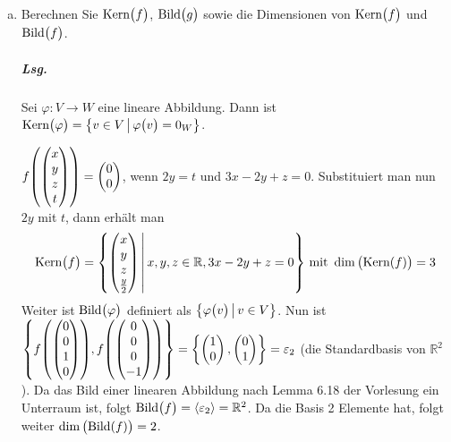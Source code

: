 \documentclass{scrreprt}
\newcommand\Bild{\text{Bild}}
\newcommand\Kern{\text{Kern}}
\newcommand\hull[1]{\left\langle #1 \right\rangle}
\begin{document}
\begin{enumerate}[(a)]
\item Berechnen Sie $\Kern\qty\big(f)$, $\Bild\qty\big(g)$ sowie die Dimensionen
  von $\Kern\qty\big(f)$ und $\Bild\qty\big(f)$.
  \subparagraph{Lsg.} Sei $\varphi \colon V \to W$ eine lineare Abbildung.
  Dann ist $\Kern\qty\big(\varphi) =
  \qty\big{v \in V \,{\big |}\, \varphi\qty\big(v) = 0_W}$.

  $f\qty(\begin{pmatrix} x \\ y \\ z \\ t\end{pmatrix}) =
  \begin{pmatrix} 0 \\ 0 \end{pmatrix}$, wenn $2y = t$ und
  $3x - 2y + z = 0$.
  Substituiert man nun $2y$ mit $t$, dann erhält man
  \[
    \Kern\qty\big(f) = \qty{
      \begin{pmatrix}
        x \\
        y \\
        z \\
        \frac{y}{2}
      \end{pmatrix} \,\middle|\,
      x, y, z \in \mathbb{R}, 3x - 2y + z = 0
    } \text{ mit } \dim\qty\big(\Kern(f)) = 3
  \]
  Weiter ist $\Bild\qty\big(\varphi)$ definiert als
  $\qty\big{\varphi\qty\big(v) \,{\big|}\, v \in V}$.
  Nun ist $\qty{
    f\qty(\begin{pmatrix} 0 \\ 0 \\ 1 \\ 0\end{pmatrix}),
    f\qty(\begin{pmatrix} 0 \\ 0 \\ 0 \\ -1\end{pmatrix})
  } = \qty{
    \begin{pmatrix} 1 \\ 0 \end{pmatrix},
    \begin{pmatrix} 0 \\ 1 \end{pmatrix}
  } = \varepsilon_2$ (die Standardbasis von $\mathbb{R}^2$).
  Da das Bild einer linearen Abbildung nach Lemma 6.18 der Vorlesung
  ein Unterraum ist, folgt $\Bild\qty\big(f) = \hull{\varepsilon_2} = \mathbb{R}^2$.
  Da die Basis 2 Elemente hat, folgt weiter $\dim\qty\big(\Bild(f)) = 2$.


\end{enumerate}
\end{document}
